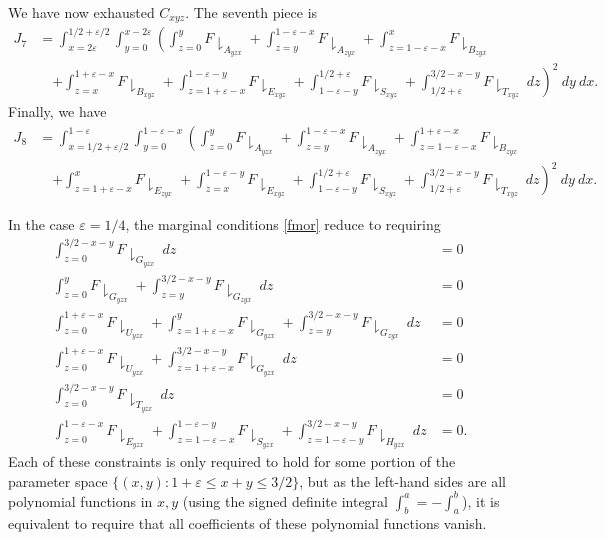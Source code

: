 \documentclass{bmcart}
\theoremstyle{plain}
\theoremstyle{definition}
\newcommand\eps{\varepsilon}
\begin{document}
We have now exhausted $C_{xyz}$.  The seventh piece is
\begin{align*}
J_7 & = \int_{x=2\eps}^{1/2+\eps/2}\int_{y=0}^{x-2\eps} \left(\int_{z=0}^{y}F\downharpoonright_{A_{yzx}}+\int_{z=y}^{1-\eps-x}F\downharpoonright_{A_{zyx}} +\int_{z=1-\eps-x}^{x}F\downharpoonright_{B_{zyx}} \right. \\
&\quad \left. +\int_{z=x}^{1+\eps-x}F\downharpoonright_{B_{xyz}} + \int_{z=1+\eps-x}^{1-\eps-y}F\downharpoonright_{E_{xyz}} + \int_{1-\eps-y}^{1/2+\eps}F\downharpoonright_{S_{xyz}}+ \int_{1/2+\eps}^{3/2-x-y}F\downharpoonright_{T_{xyz}} \ dz \right)^{2}\ dy\ dx.
\end{align*}
Finally, we have
\begin{align*}
J_8 & = \int_{x=1/2+\eps/2}^{1-\eps}\int_{y=0}^{1-\eps-x} \left(\int_{z=0}^{y}F\downharpoonright_{A_{yzx}}+\int_{z=y}^{1-\eps-x}F\downharpoonright_{A_{zyx}} +\int_{z=1-\eps-x}^{1+\eps-x}F\downharpoonright_{B_{zyx}} \right. \\
&\quad \left. + \int_{z=1+\eps-x}^{x}F\downharpoonright_{E_{zyx}} + \int_{z=x}^{1-\eps-y}F\downharpoonright_{E_{xyz}} + \int_{1-\eps-y}^{1/2+\eps}F\downharpoonright_{S_{xyz}}+ \int_{1/2+\eps}^{3/2-x-y}F\downharpoonright_{T_{xyz}}\ dz \right)^{2}\ dy\ dx.
\end{align*}

In the case $\eps=1/4$, the marginal conditions \eqref{fmor} reduce to requiring
\begin{align}
\int_{z=0}^{3/2-x-y}F\downharpoonright_{G_{yzx}}\ dz &= 0\label{m1}\\
\int_{z=0}^{y}F\downharpoonright_{G_{yzx}} +\int_{z=y}^{3/2-x-y}F\downharpoonright_{G_{zyx}}\ dz &= 0\label{m2}\\
\int_{z=0}^{1+\varepsilon-x}F\downharpoonright_{U_{yzx}} + \int_{z=1+\varepsilon-x}^{y}F\downharpoonright_{G_{yzx}} +\int_{z=y}^{3/2-x-y}F\downharpoonright_{G_{zyx}}\ dz &= 0\label{m3}\\
\int_{z=0}^{1+\varepsilon-x}F\downharpoonright_{U_{yzx}} + \int_{z=1+\varepsilon-x}^{3/2-x-y}F\downharpoonright_{G_{yzx}}\ dz &= 0\label{m4}\\
\int_{z=0}^{3/2-x-y}F\downharpoonright_{T_{yzx}}\ dz &= 0\label{m5}\\
\int_{z=0}^{1-\varepsilon-x}F\downharpoonright_{E_{yzx}} + \int_{z=1-\varepsilon-x}^{1-\varepsilon-y}F\downharpoonright_{S_{yzx}} + \int_{z=1-\varepsilon-y}^{3/2-x-y}F\downharpoonright_{H_{yzx}}\ dz &= 0.\label{m7}
\end{align}
Each of these constraints is only required to hold for some portion of the parameter space $\{ (x,y): 1+\eps \leq x+y \leq 3/2 \}$, but as the left-hand sides are all polynomial functions in $x,y$ (using the signed definite integral $\int_b^a = -\int_a^b$), it is equivalent to require that all coefficients of these polynomial functions vanish.
\end{document}
